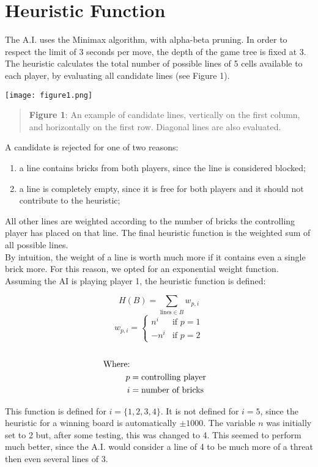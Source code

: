 \documentclass[10pt]{article}
\begin{document}
\section{Heuristic Function}
The A.I. uses the Minimax algorithm, with alpha-beta pruning. In order to respect the limit of 3 seconds per move, the depth of the game tree is fixed at 3.
The heuristic calculates the total number of possible lines of 5 cells available to each player, by evaluating all candidate lines (see Figure 1).
\begin{center}
\texttt{[image: figure1.png]}
\begin{quote}
{\bf Figure 1}: An example of candidate lines, vertically on the first column, and horizontally on the first row. Diagonal lines are also evaluated.
\end{quote}
\end{center}
A candidate is rejected for one of two reasons: 
\begin{enumerate}[1.]
\item a line contains bricks from both players, since the line is considered blocked;
\item a line is completely empty, since it is free for both players and it should not contribute to the heuristic;
\end{enumerate}
All other lines are weighted according to the number of bricks the controlling player has placed on that line. The final heuristic function is the weighted sum of all possible lines. \\
By intuition, the weight of a line is worth much more if it contains even a single brick more. For this reason, we opted for an exponential weight function. Assuming the AI is playing player 1, the heuristic function is defined:

\begin{multicols}{2}
$$ H(B) = \sum_{\text{lines} \in B} w_{p, i} $$
$$ w_{p, i} = \left\{ \begin{array}{ll}
n^{i} & \mbox{if $p = 1$} \\
-n^{i} & \mbox{if $p = 2$}
\end{array} \right. $$
\begin{align*} \hfill \\
\text{Where:} \\
p &= \text{controlling player} \\
i &= \text{number of bricks}
\end{align*}
\end{multicols}
This function is defined for $i = \{1, 2, 3, 4\}$. It is not defined for $i = 5$, since the heuristic for a winning board is automatically $\pm 1000$. The variable $n$ was initially set to 2 but, after some testing, this was changed to 4. This seemed to perform much better, since the A.I. would consider a line of 4 to be much more of a threat then even several lines of 3.
\end{document}
